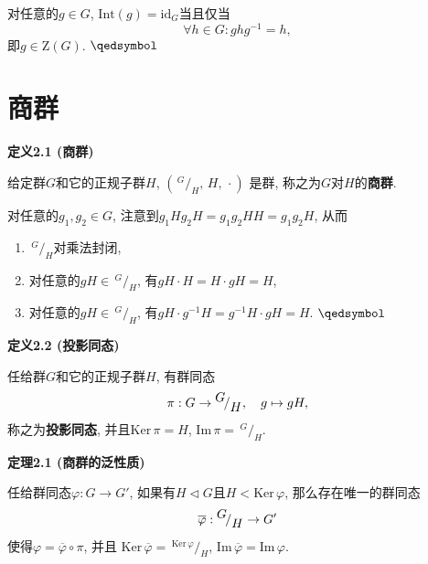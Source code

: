 \documentclass[UTF8]{ctexart}
\begin{document}

对任意的$g\in G$, $\mathrm{Int}(g)=\mathrm{id}_{G}$当且仅当
\[
    \forall h\in G:ghg^{-1}=h,
\]
即$g\in \mathrm{Z}(G)$. \hfill $\qedsymbol$





\newpage

\section{商群}

\hypertarget{sec:定义2.1}{}
\noindent\textbf{定义2.1 (商群)}

\vspace{3pt}
给定群$G$和它的正规子群$H$,
$\left(\,\!^{\displaystyle G}\!/_{\displaystyle H},\,H,\,\cdot\right)$
是群, 称之为$G$对$H$的\textbf{商群}.


对任意的$g_1,g_2\in G$, 注意到$g_1Hg_2H=g_1g_2HH=g_1g_2H$, 从而
\vspace{3pt}
\begin{enumerate}
    \item $\,\!^{\displaystyle G}\!/_{\displaystyle H}$对乘法封闭,
    \vspace{3pt}
    \item 对任意的$gH\in\,\!^{\displaystyle G}\!/_{\displaystyle H}$,
    有$gH\cdot H=H\cdot gH=H$,
    \vspace{3pt}
    \item 对任意的$gH\in\,\!^{\displaystyle G}\!/_{\displaystyle H}$,
    有$gH\cdot g^{-1}H=g^{-1}H\cdot gH=H$. \hfill $\qedsymbol$
\end{enumerate}

\vspace{10pt}

\hypertarget{sec:定义2.2}{}
\noindent\textbf{定义2.2 (投影同态)}

任给群$G$和它的正规子群$H$, 有群同态
\[
    \pi:G\to\,\!^{\displaystyle G}\!/_{\displaystyle H},\quad g\mapsto gH,\\[3pt]
\]
称之为\textbf{投影同态}, 并且$\mathrm{Ker}\,\pi=H$,
$\mathrm{Im}\,\pi=\,\!^{\displaystyle G}\!/_{\displaystyle H}$.

\vspace{15pt}

\hypertarget{sec:定理2.1}{}
\noindent\textbf{定理2.1 (商群的泛性质)}

任给群同态$\varphi:G\to G'$, 如果有$H\lhd G$且$H<\mathrm{Ker}\,\varphi$,
那么存在唯一的群同态
\vspace{3pt}
\[
    \overline{\varphi}:\,\!^{\displaystyle G}\!/_{\displaystyle H}\to G'\\[3pt]
\]
使得$\varphi=\overline{\varphi}\circ\pi$, 并且
$\mathrm{Ker}\,\overline{\varphi}=
\,\!^{\displaystyle\mathrm{Ker}\,\varphi}\!/_{\displaystyle H}$,
$\mathrm{Im}\,\overline{\varphi}=\mathrm{Im}\,\varphi$.
\end{document}
